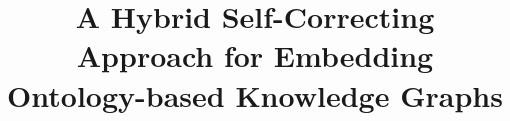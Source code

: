 \documentclass[sigconf]{acmart}
\begin{document}
\title{A Hybrid Self-Correcting Approach for Embedding
Ontology-based Knowledge Graphs}
  
\renewcommand{\shorttitle}{SIG Proceedings Paper in LaTeX Format}

\end{document}
